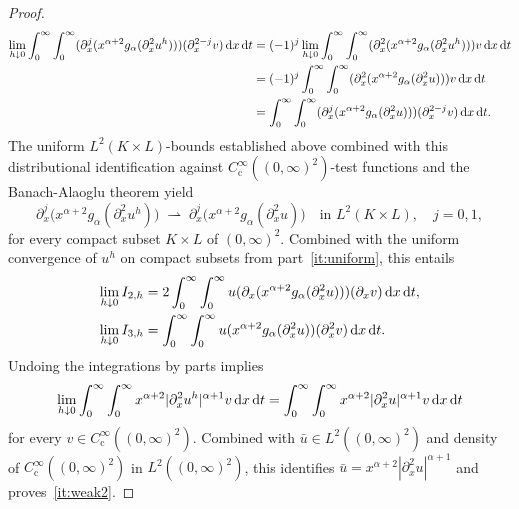 \documentclass[reqno,12pt]{amsart}
\renewcommand{\d}{\ensuremath{\mathrm{d}}}
\renewcommand{\d}{\ensuremath{{\rm d}}}
\numberwithin{equation}{section}
\begin{document}
\begin{proof}
%
\begin{align*}
\lim_{h \downarrow 0} \int_0^\infty \int_0^\infty (\partial_x^j(x^{\alpha+2} g_\alpha(\partial_x^2 u^h))) (\partial_x^{2-j} v) \, \d x \, \d t &= (-1)^j \lim_{h \downarrow 0} \int_0^\infty \int_0^\infty (\partial_x^2(x^{\alpha+2} g_\alpha(\partial_x^2 u^h))) v \, \d x \, \d t \\
&= (-1)^j \int_0^\infty \int_0^\infty (\partial_x^2(x^{\alpha+2} g_\alpha(\partial_x^2 u))) v \, \d x \, \d t \\
&= \int_0^\infty \int_0^\infty (\partial_x^j(x^{\alpha+2} g_\alpha(\partial_x^2 u))) (\partial_x^{2-j} v) \, \d x \, \d t. 
\end{align*}
%
The uniform $L^2(K \times L)$-bounds established above combined with this distributional identification against $C^\infty_\mathrm{c}((0,\infty)^2)$-test functions and the Banach-Alaoglu theorem yield
%
\[
\partial_x^j \bigl(x^{\alpha+2} g_\alpha(\partial_x^2 u^h)\bigr) \;\rightharpoonup\; \partial_x^j \bigl(x^{\alpha+2} g_\alpha(\partial_x^2 u)\bigr) \quad \text{in } L^2(K \times L), \quad j = 0, 1,
\]
%
for every compact subset $K \times L$ of $(0,\infty)^2$. Combined with the uniform convergence of $u^h$ on compact subsets from part~\eqref{it:uniform}, this entails
%
\begin{align*}
\lim_{h \downarrow 0} I_{2,h} &= 2 \int_0^\infty \int_0^\infty u (\partial_x(x^{\alpha+2} g_\alpha(\partial_x^2 u))) (\partial_x v) \, \d x \, \d t, \\
\lim_{h \downarrow 0} I_{3,h} &= \int_0^\infty \int_0^\infty u (x^{\alpha+2} g_\alpha(\partial_x^2 u)) (\partial_x^2 v) \, \d x \, \d t.
\end{align*}
%
%
Undoing the integrations by parts implies
%
\[
\lim_{h \downarrow 0} \int_0^\infty \int_0^\infty x^{\alpha+2} |\partial_x^2 u^h|^{\alpha+1} v \, \d x \, \d t = \int_0^\infty \int_0^\infty x^{\alpha+2} |\partial_x^2 u|^{\alpha+1} v \, \d x \, \d t
\]
%
for every $v \in C^\infty_\mathrm{c}((0,\infty)^2)$. Combined with $\bar u \in L^2((0,\infty)^2)$ and density of $C^\infty_\mathrm{c}((0,\infty)^2)$ in $L^2((0,\infty)^2)$, this identifies $\bar u = x^{\alpha+2} |\partial_x^2 u|^{\alpha+1}$ and proves~\eqref{it:weak2}.

%
\bigskip
%


\end{proof}
\end{document}
